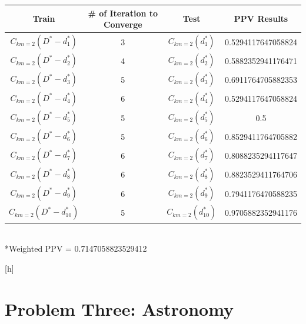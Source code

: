 \documentclass{article}
\begin{document}
\begin{enumerate}
\begin{table}[h]
				\centering
				\begin{tabular}{c||c| c|c}
					\\
					\hline
					Train & \# of Iteration to Converge & Test & PPV Results\\
					\hline
					$C_{km=2}(D^* - d^*_1)$ & 3 & $C_{km=2}( d^*_1)$&0.5294117647058824\\
					$C_{km=2}(D^* - d^*_2)$ & 4 & $C_{km=2}( d^*_2)$&0.5882352941176471\\
					$C_{km=2}(D^* - d^*_3)$ & 5 & $C_{km=2}( d^*_3)$&0.6911764705882353\\
					$C_{km=2}(D^* - d^*_4)$ & 6 & $C_{km=2}( d^*_4)$&0.5294117647058824\\
					$C_{km=2}(D^* - d^*_5)$ & 5 & $C_{km=2}( d^*_5)$&0.5\\
					$C_{km=2}(D^* - d^*_6)$ & 5 & $C_{km=2}( d^*_6)$&0.8529411764705882\\
					$C_{km=2}(D^* - d^*_7)$ & 6 & $C_{km=2}( d^*_7)$&0.8088235294117647\\
					$C_{km=2}(D^* - d^*_8)$ & 6 & $C_{km=2}( d^*_8)$&0.8823529411764706\\
					$C_{km=2}(D^* - d^*_9)$ & 6 & $C_{km=2}( d^*_9)$ &0.7941176470588235\\
					$C_{km=2}(D^* - d^*_10)$ & 5 & $C_{km=2}( d^*_10)$&0.9705882352941176\\
					\hline	
				\end{tabular} \\
				*Weighted PPV = 0.7147058823529412
			\end{table}[h] \\		
\end{enumerate}
\pagebreak
\section*{Problem Three: Astronomy}
\end{document}

